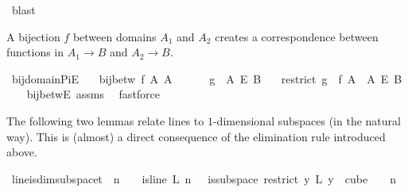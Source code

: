 \begin{isabellebody}
\ blast\isanewline
{}\isamarkupfalse%
%
\endisatagproof
{\isafoldproof}%
%
\isadelimproof
%
\endisadelimproof
%
\begin{isamarkuptext}%
A bijection $f$ between domains $A_1$ and $A_2$ creates a correspondence between functions in $A_1 \rightarrow B$ and $A_2 \rightarrow B$.%
\end{isamarkuptext}\isamarkuptrue%
\isamarkupfalse%
\ bij{\isacharunderscore}{\kern0pt}domain{\isacharunderscore}{\kern0pt}PiE{\isacharcolon}{\kern0pt}\isanewline
\ \ \ {\isachardoublequoteopen}bij{\isacharunderscore}{\kern0pt}betw\ f\ A{}\ A{}{\isachardoublequoteclose}\ \isanewline
\ \ \ \ \ {\isachardoublequoteopen}g\ {\isasymin}\ A{}\ {\isasymrightarrow}\isactrlsub E\ B{\isachardoublequoteclose}\isanewline
\ \ \ {\isachardoublequoteopen}{\isacharparenleft}{\kern0pt}restrict\ {\isacharparenleft}{\kern0pt}g\ {\isasymcirc}\ f{\isacharparenright}{\kern0pt}\ A{}{\isacharparenright}{\kern0pt}\ {\isasymin}\ A{}\ {\isasymrightarrow}\isactrlsub E\ B{\isachardoublequoteclose}\isanewline
%
\isadelimproof
\ \ %
\endisadelimproof
%
\isatagproof
{}\isamarkupfalse%
\ bij{\isacharunderscore}{\kern0pt}betwE\ assms\ \isamarkupfalse%
\ fastforce%
\endisatagproof
{\isafoldproof}%
%
\isadelimproof
%
\endisadelimproof
%
\begin{isamarkuptext}%
The following two lemmas relate lines to $1$-dimensional subspaces (in the natural way). This is (almost) a direct consequence of the elimination rule  introduced above.%
\end{isamarkuptext}\isamarkuptrue%
\isamarkupfalse%
\ line{\isacharunderscore}{\kern0pt}is{\isacharunderscore}{\kern0pt}dim{}{\isacharunderscore}{\kern0pt}subspace{\isacharunderscore}{\kern0pt}t{\isacharunderscore}{\kern0pt}{}{\isacharcolon}{\kern0pt}\ \ {\isachardoublequoteopen}n\ {\isachargreater}{\kern0pt}\ {}{\isachardoublequoteclose}\ \ {\isachardoublequoteopen}is{\isacharunderscore}{\kern0pt}line\ L\ n\ {}{\isachardoublequoteclose}\ \ {\isachardoublequoteopen}is{\isacharunderscore}{\kern0pt}subspace\ {\isacharparenleft}{\kern0pt}restrict\ {\isacharparenleft}{\kern0pt}{\isasymlambda}y{\isachardot}{\kern0pt}\ L\ {\isacharparenleft}{\kern0pt}y\ {}{\isacharparenright}{\kern0pt}{\isacharparenright}{\kern0pt}\ {\isacharparenleft}{\kern0pt}cube\ {}\ {}{\isacharparenright}{\kern0pt}{\isacharparenright}{\kern0pt}\ {}\ n\ {}{\isachardoublequoteclose}\isanewline

\end{isabellebody}
